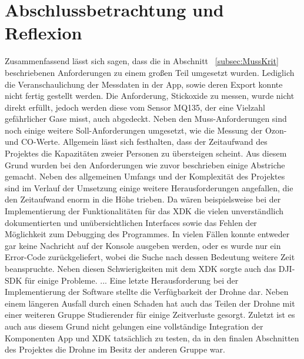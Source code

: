 
\chapter{Abschlussbetrachtung und Reflexion}\label{cha:Fazit}
Zusammenfassend lässt sich sagen, dass die in Abschnitt ~\ref{subsec:MussKrit} beschriebenen Anforderungen zu einem großen Teil umgesetzt wurden.\newline
Lediglich die Veranschaulichung der Messdaten in der App, sowie deren Export konnte nicht fertig gestellt werden. Die Anforderung, Stickoxide zu messen, wurde nicht direkt erfüllt, jedoch werden diese vom Sensor MQ135, der eine Vielzahl gefährlicher Gase misst, auch abgedeckt. Neben den Muss-Anforderungen sind noch einige weitere Soll-Anforderungen umgesetzt, wie die Messung der Ozon- und \acl{CO}-Werte.\newline
\newline
Allgemein lässt sich festhalten, dass der Zeitaufwand des Projektes die Kapazitäten zweier Personen zu übersteigen scheint. Aus diesem Grund wurden bei den Anforderungen wie zuvor beschrieben einige Abstriche gemacht. Neben des allgemeinen Umfangs und der Komplexität des Projektes sind im Verlauf der Umsetzung einige weitere Herausforderungen angefallen, die den Zeitaufwand enorm in die Höhe trieben. \newline
\newline
Da wären beispielsweise bei der Implementierung der Funktionalitäten für das \acs{XDK} die vielen unverständlich dokumentierten und unübersichtlichen Interfaces sowie das Fehlen der Möglichkeit zum Debugging des Programmes. In vielen Fällen konnte entweder gar keine Nachricht auf der Konsole ausgeben werden, oder es wurde nur ein Error-Code zurückgeliefert, wobei die Suche nach dessen Bedeutung weitere Zeit beanspruchte.\newline
Neben diesen Schwierigkeiten mit dem \acs{XDK} sorgte auch das \acs{DJI}-SDK für einige Probleme. \newline
... \newline
\newline 
Eine letzte Herausforderung bei der Implementierung der Software stellte die Verfügbarkeit der Drohne dar. Neben einem längeren Ausfall durch einen Schaden hat auch das Teilen der Drohne mit einer weiteren Gruppe Studierender für einige Zeitverluste gesorgt. Zuletzt ist es auch aus diesem Grund nicht gelungen eine vollständige Integration der Komponenten App und \acs{XDK} tatsächlich zu testen, da in den finalen Abschnitten des Projektes die Drohne im Besitz der anderen Gruppe war.
